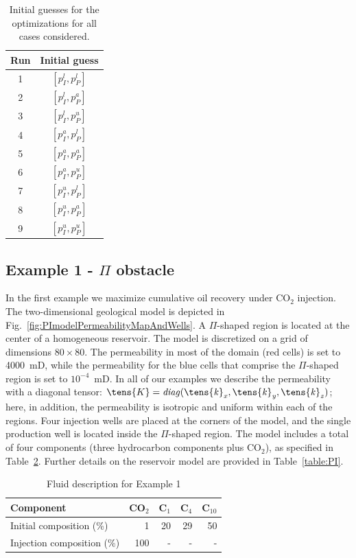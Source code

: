 \begin{table}
\centering
\caption{Initial guesses for the optimizations for all
         cases considered.}
\begin{tabular}{cc}
\toprule
Run & Initial guess    \\[2pt]
\midrule
1 & $[p_I^l, p_P^l]$ \\
2 & $[p_I^l, p_P^a]$ \\
3 & $[p_I^l, p_P^u]$ \\
4 & $[p_I^a, p_P^l]$ \\
5 & $[p_I^a, p_P^a]$ \\
6 & $[p_I^a, p_P^u]$ \\
7 & $[p_I^u, p_P^l]$ \\
8 & $[p_I^u, p_P^a]$ \\
9 & $[p_I^u, p_P^u]$ \\[2pt]
\bottomrule
\end{tabular}
  \label{table:InitialGuesses}
\end{table}





\subsection{Example 1 - $\Pi$ obstacle}

In the first example we maximize cumulative oil recovery under CO$_2$ injection. The two-dimensional geological model is depicted in Fig.~\ref{fig:PImodelPermeabilityMapAndWells}. A $\Pi$-shaped region is located at the center of a homogeneous reservoir. The model is discretized on a grid of dimensions $80\times80$. The permeability in most of the domain (red cells) is set to 4000~mD, while the permeability for the blue cells that comprise the $\Pi$-shaped region is set to $10^{-4}$~mD. In all of our examples we describe the permeability with a diagonal tensor: $\tens{K} = \it{diag}(\tens{k}_x, \tens{k}_y, \tens{k}_z)$; here, in addition, the permeability is isotropic and uniform within each of the regions. Four injection wells are placed at the corners of the model, and the single production well is located inside the $\Pi$-shaped region. The model includes a total of four components (three hydrocarbon  components plus CO$_2$), as specified in Table~\ref{table:fluidForPImodel}. Further details on the reservoir model are provided in Table~\ref{table:PI}.

%
\begin{table}
\centering
\caption{Fluid description for Example 1}
\begin{tabular}{|l|r|r|r|r|}
\hline
Component            & CO$_2$ & C$_1$ & C$_4$ & C$_{10}$    \\
\hline
Initial composition (\%)  & 1    & 20  & 29    & 50 \\
Injection composition (\%)& 100   & - & - & - \\
\hline
\end{tabular}
\label{table:fluidForPImodel}
\end{table}
%

